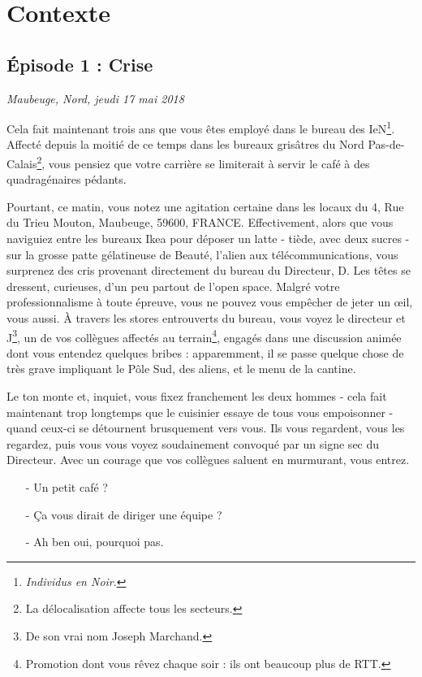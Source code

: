 
\newpage

\section{Contexte}
\subsection{Épisode 1 : Crise}
\hfill \textit{Maubeuge, Nord, jeudi 17 mai 2018}

Cela fait maintenant trois ans que vous êtes employé dans le bureau des
IeN\footnote{\emph{Individus en Noir}\texttrademark.}.  Affecté depuis la moitié
de ce temps dans les bureaux grisâtres du Nord Pas-de-Calais\footnote{La
délocalisation affecte tous les secteurs.}, vous pensiez que votre carrière se
limiterait à servir le café à des quadragénaires pédants. 

Pourtant, ce matin, vous notez une agitation certaine dans les locaux du 4, Rue
du Trieu Mouton, Maubeuge, 59600, FRANCE.  Effectivement, alors que vous
naviguiez entre les bureaux Ikea pour déposer un latte - tiède, avec deux sucres
- sur la grosse patte gélatineuse de Beauté, l'alien aux télécommunications,
vous surprenez des cris provenant directement du bureau du Directeur, D. Les
têtes se dressent, curieuses, d'un peu partout de l'open space. Malgré votre
professionnalisme à toute épreuve, vous ne pouvez vous empêcher de jeter un œil,
vous aussi. À travers les stores entrouverts du bureau, vous voyez le directeur
et J\footnote{De son vrai nom Joseph Marchand.}, un de vos collègues affectés au
terrain\footnote{Promotion dont vous rêvez chaque soir : ils ont beaucoup plus
de RTT.}, engagés dans une discussion animée dont vous entendez quelques bribes
: apparemment, il se passe quelque chose de très grave impliquant le Pôle Sud,
des aliens, et le menu de la cantine.

Le ton monte et, inquiet, vous fixez franchement les deux hommes - cela fait
maintenant trop longtemps que le cuisinier essaye de tous vous empoisonner -
quand ceux-ci se détournent brusquement vers vous. Ils vous regardent, vous les
regardez, puis vous vous voyez soudainement convoqué par un signe sec du
Directeur. Avec un courage que vos collègues saluent en murmurant, vous entrez.

\begin{itemize}
\item[-] Un petit café ?
\item[-] Ça vous dirait de diriger une équipe ?
\item[-] Ah ben oui, pourquoi pas.
\end{itemize}

